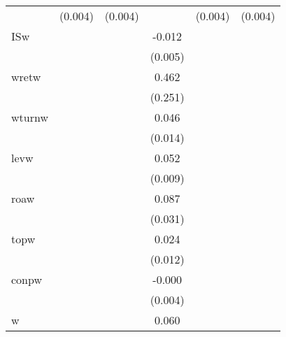 {\begin{tabular}{l*{5}{c}}
            &     (0.004)         &     (0.004)         &                     &     (0.004)         &     (0.004)         \\
ISw         &                     &                     &      -0.012\sym{**} &                     &                     \\
            &                     &                     &     (0.005)         &                     &                     \\
wretw       &                     &                     &       0.462\sym{*}  &                     &                     \\
            &                     &                     &     (0.251)         &                     &                     \\
wturnw      &                     &                     &       0.046\sym{***}&                     &                     \\
            &                     &                     &     (0.014)         &                     &                     \\
levw        &                     &                     &       0.052\sym{***}&                     &                     \\
            &                     &                     &     (0.009)         &                     &                     \\
roaw        &                     &                     &       0.087\sym{***}&                     &                     \\
            &                     &                     &     (0.031)         &                     &                     \\
topw        &                     &                     &       0.024\sym{**} &                     &                     \\
            &                     &                     &     (0.012)         &                     &                     \\
conpw       &                     &                     &      -0.000         &                     &                     \\
            &                     &                     &     (0.004)         &                     &                     \\
w           &                     &                     &       0.060\sym{***}&                     &                     \\

\end{tabular}}
